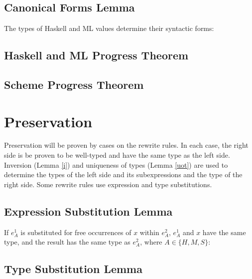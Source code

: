 

\subsection{Canonical Forms Lemma}

The types of Haskell and ML values determine their syntactic forms:



\subsection{Haskell and ML Progress Theorem}



\subsection{Scheme Progress Theorem}



\section{Preservation}

Preservation will be proven by cases on the rewrite rules.  In each case, the right side is be proven to be well-typed and have the same type as the left side.  Inversion (Lemma \ref{i}) and uniqueness of types (Lemma \ref{uot}) are used to determine the types of the left side and its subexpressions and the type of the right side.  Some rewrite rules use expression and type substitutions.

\subsection{Expression Substitution Lemma}

If $e_{A}^{1}$ is substituted for free occurrences of $x$ within $e_{A}^{2}$, $e_{A}^{1}$ and $x$ have the same type, and the result has the same type as $e_{A}^{2}$, where $A\in\lbrace H,M,S\rbrace$:



\subsection{Type Substitution Lemma}

